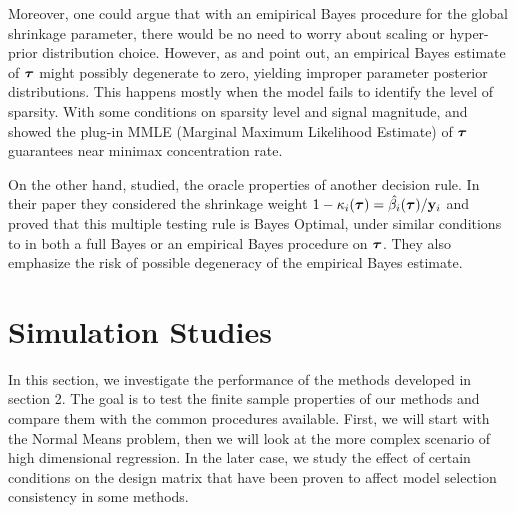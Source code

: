 \documentclass[10pt]{article}
\begin{document}
Moreover, one could argue that with an emipirical Bayes procedure for the global shrinkage parameter, there would be no need to worry about scaling or hyper-prior distribution choice. However, as \cite{van2017adaptive} and \cite{datta2013asymptotic} point out, an empirical Bayes estimate of $\boldsymbol{\tau}$ might possibly degenerate to zero, yielding improper parameter posterior distributions. This happens mostly when the model fails to identify the level of sparsity. With some conditions on sparsity level and signal magnitude, \cite{van2014horseshoe} and \cite{van2015conditions} showed the plug-in MMLE (Marginal Maximum Likelihood Estimate) of $\boldsymbol{\tau}$ guarantees near minimax concentration rate. 
 
 On the other hand, \cite{datta2013asymptotic} studied, the oracle properties of another decision rule. In their paper they considered the shrinkage weight $1 - \kappa_i(\boldsymbol{\tau}) = \hat{\beta_i}(\boldsymbol{\tau})/{\bf y}_i $ and proved that this multiple testing rule is Bayes Optimal, under similar conditions to \cite{van2014horseshoe} in both a full Bayes or an empirical Bayes procedure on $\boldsymbol{\tau}$. They also emphasize the risk of possible degeneracy of the empirical Bayes estimate.
 
 





\section{Simulation Studies}\label{sec:sim}

In this section, we investigate the performance of the methods developed in section 2. The goal is to test the finite sample properties of our methods and compare them with the common procedures available. First, we will start with the Normal Means problem, then we will look at the more complex scenario of high dimensional regression. In the later case, we study the effect of certain conditions on the design matrix that have been proven to affect model selection consistency in some methods.
\end{document}
